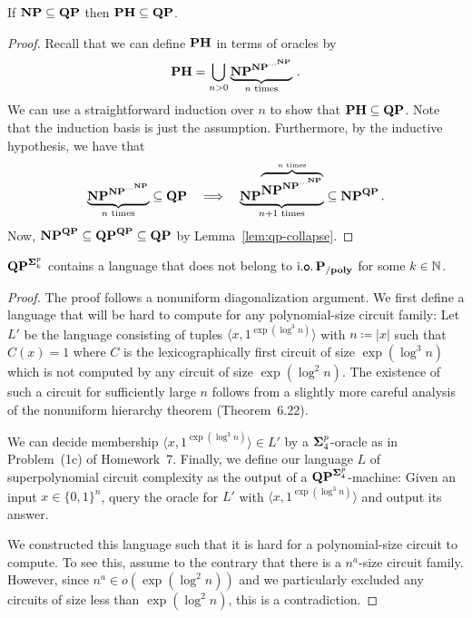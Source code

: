 \documentclass[11pt]{article}
\begin{document}
\begin{lemma}
	\label{lem:ph-sub-qp}
	If $\mathbf{NP} \subseteq \mathbf{QP}$ then
	$\mathbf{PH} \subseteq \mathbf{QP}$.
\end{lemma}

\begin{proof}
  Recall that we can define $\mathbf{PH}$ in terms of oracles by
  \[
    \mathbf{PH} =
    \bigcup_{n > 0} \underbrace{\mathbf{NP}^{\mathbf{NP}^{\cdots^{\mathbf{NP}}}}}_{n \textrm{ times}}
    \,.
  \]
  We can use a straightforward induction over $n$ to show that
  $\mathbf{PH} \subseteq \mathbf{QP}$.
  Note that the induction basis is just the assumption.
  Furthermore, by the inductive hypothesis, we have that
  \[
    \underbrace{\mathbf{NP}^{\mathbf{NP}^{\cdots^{\mathbf{NP}}}}}_{n \textrm{ times}}
    \subseteq
    \mathbf{QP}
    \quad
    \Longrightarrow
    \quad
    \underbrace{\mathbf{NP}^{\overbrace{
      \mathbf{NP}^{\mathbf{NP}^{\cdots^{\mathbf{NP}}}}
    }^{n \textrm{ times}}}}_{n+1 \textrm{ times}}
    \subseteq
    \mathbf{NP}^{\mathbf{QP}} \,.
  \]
  Now, $\mathbf{NP}^{\mathbf{QP}} \subseteq \mathbf{QP}^{\mathbf{QP}} \subseteq \mathbf{QP} $
  by Lemma~\ref{lem:qp-collapse}.
\end{proof}

\begin{lemma}
	\label{lem:qp-super-circ}
	$\mathbf{QP}^{\mathbf{\Sigma}^p_k}$ contains a language that does not belong
	to $\mathsf{i.o.}\, \mathbf{P_{/poly}}$ for some $k \in {\mathbb{N}}$.
\end{lemma}

\begin{proof}
	The proof follows a nonuniform diagonalization argument. We first define
	a language that will be hard to compute for any polynomial-size circuit
	family:
	Let $L'$ be the language consisting of tuples
	$\langle x, 1^{\exp(\log^3 n)} \rangle$
	with $n \coloneqq |x|$
	such that $C(x) = 1$ where $C$ is the
	lexicographically first circuit of size $\exp(\log^3 n)$ which is not
	computed by any circuit of size $\exp(\log^2 n)$.
	The existence of such a circuit for sufficiently large $n$ follows from a
	slightly more careful analysis of the nonuniform hierarchy theorem
	(Theorem~6.22).
	
	We can decide membership $\langle x, 1^{\exp(\log^3 n)} \rangle \in L'$
	by a $\mathbf{\Sigma}^p_4$-oracle as in Problem~(1c) of Homework~7.
	Finally, we define our language $L$ of superpolynomial circuit complexity
	as the output of a $\mathbf{QP}^{\mathbf{\Sigma}^p_4}$-machine: Given an input
	$x \in \{0,1\}^n$, query the oracle for $L'$ with
	$\langle x, 1^{\exp(\log^3 n)} \rangle$ and output its answer.
	
	We constructed this language such that it is hard for a polynomial-size
	circuit to compute. To see this, assume to the contrary that there is
	a $n^a$-size circuit family.
	However, since $n^a \in o(\exp(\log^2 n))$ and we particularly excluded any
	circuits of size less than $\exp(\log^2 n)$, this is a contradiction.
\end{proof}
\end{document}
